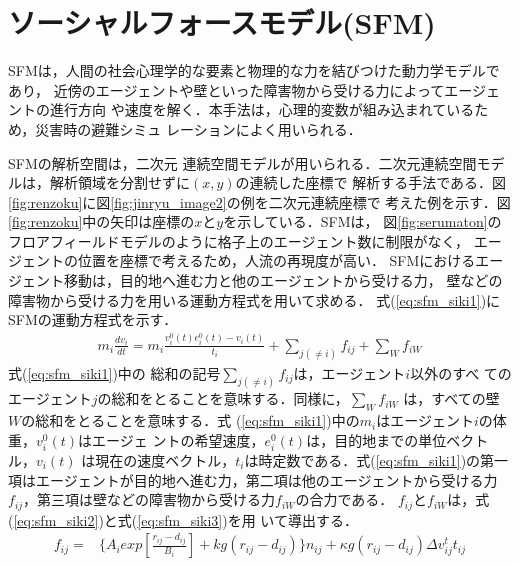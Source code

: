 \section{ソーシャルフォースモデル(SFM)}
SFMは，人間の社会心理学的な要素と物理的な力を結びつけた動力学モデルであり，
近傍のエージェントや壁といった障害物から受ける力によってエージェントの進行方向
や速度を解く．本手法は，心理的変数が組み込まれているため，災害時の避難シミュ
レーションによく用いられる\cite{21_Isozaki}\cite{ando_sfm}．

SFMの解析空間は，二次元
連続空間モデルが用いられる．二次元連続空間モデルは，解析領域を分割せずに$(x,y)$の連続した座標で
解析する手法である．図\ref{fig:renzoku}に図\ref{fig:jinryu_image2}の例を二次元連続座標で
考えた例を示す．図\ref{fig:renzoku}中の矢印は座標の$x$と$y$を示している．SFMは，
図\ref{fig:serumaton}のフロアフィールドモデルのように格子上のエージェント数に制限がなく，
エージェントの位置を座標で考えるため，人流の再現度が高い．
SFMにおけるエージェント移動は，目的地へ進む力と他のエージェントから受ける力，
壁などの障害物から受ける力を用いる運動方程式を用いて求める．
式(\ref{eq:sfm_siki1})にSFMの運動方程式を示す．
%
\begin{eqnarray}
 m_i \frac{dv_i}{dt} = m_i \frac{v_i^0(t)e_i^0(t)-v_i(t)}{t_i}
 +\sum_{j(\neq i)}f_{ij}+\sum_{W}f_{iW}
 \label{eq:sfm_siki1}
\end{eqnarray}
%
式(\ref{eq:sfm_siki1})中の
総和の記号$\sum_{j(\neq i)}f_{ij}$は，エージェント$i$以外のすべ
てのエージェント$j$の総和をとることを意味する．同様に，$\sum_{W}f_{iW}$
は，すべての壁$W$の総和をとることを意味する．式
(\ref{eq:sfm_siki1})中の$m_i$はエージェント$i$の体重，$v_i^0(t)$はエージェ
ントの希望速度，$e_i^0(t)$は，目的地までの単位ベクトル，$v_i(t)$
は現在の速度ベクトル，$t_i$は時定数である．式(\ref{eq:sfm_siki1})の第一
項はエージェントが目的地へ進む力，第二項は他のエージェントから受ける力
$f_{ij}$，第三項は壁などの障害物から受ける力$f_{iW}$の合力である．
$f_{ij}$と$f_{iW}$は，式(\ref{eq:sfm_siki2})と式(\ref{eq:sfm_siki3})を用
いて導出する．
%
\begin{eqnarray}
 f_{ij} = & \{A_i exp[\frac{r_{ij} - d_{ij}}{B_i}]
  + kg(r_{ij} - d_{ij})\} n_{ij}
+ \kappa g (r_{ij} - d_{ij}) \Delta
  v^t_{ij} t_{ij}
 \label{eq:sfm_siki2}
\end{eqnarray}
